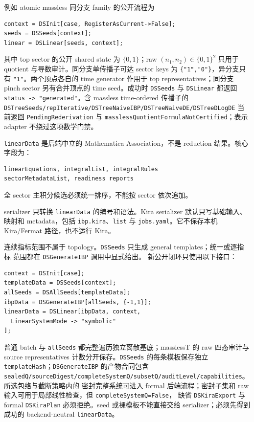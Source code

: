 ﻿\documentclass[a4paper,11pt]{article}
\begin{document}
例如 atomic massless 同分支 family 的公开流程为
\begin{verbatim}
context = DSInit[case, RegisterAsCurrent->False];
seeds = DSSeeds[context];
linear = DSLinear[seeds, context];
\end{verbatim}
其中 top sector 的公开 shared state 为 $\{0,1\}$；raw $(n_1,n_2)\in\{0,1\}^2$ 只用于 quotient 与导数审计。同分支单传播子可达 sector keys 为 \texttt{\{"1","0"\}}，异分支只有 \texttt{"1"}。两个顶点各自的 time generator 作用于 top representatives；同分支 pinch sector 另有合并顶点的 time seed。成功时 \texttt{DSSeeds} 与 \texttt{DSLinear} 都返回 \texttt{status -> "generated"}。含 massless time-ordered 传播子的 \texttt{DSTreeSeeds/repIterative/DSTreeNaiveIBP/DSTreeNaiveDE/DSTreeDLogDE} 当前返回 \texttt{PendingRederivation} 与 \texttt{masslessQuotientFormulaNotCertified}；表示 adapter 不绕过这项数学门禁。

\texttt{linearData} 是后端中立的 Mathematica Association，不是 reduction 结果。核心字段为：
\begin{verbatim}
linearEquations, integralList, integralRules
sectorMetadataList, readiness reports
\end{verbatim}
全 sector 主积分候选必须统一排序，不能按 sector 依次追加。

serializer 只转换 \texttt{linearData} 的编号和语法。Kira serializer 默认只写基础输入、映射和 metadata，包括 \texttt{ibp.kira}、\texttt{list} 与 \texttt{jobs.yaml}。它不保存本机 Kira/Fermat 路径，也不运行 Kira。

连续指标范围不属于 topology。\texttt{DSSeeds} 只生成 general templates；统一或逐指标
范围都在 \texttt{DSGenerateIBP} 调用中显式给出。
新公开闭环只使用以下接口：
\begin{verbatim}
context = DSInit[case];
templateData = DSSeeds[context];
allSeeds = DSAllSeeds[templateData];
ibpData = DSGenerateIBP[allSeeds, {-1,1}];
linearData = DSLinear[ibpData, context,
  LinearSystemMode -> "symbolic"
];
\end{verbatim}
普通 batch 与 \texttt{allSeeds} 都完整遍历独立离散基底；masslessT 的 raw 四态审计与 source representatives 计数分开保存。\texttt{DSSeeds} 的每条模板保存独立
\texttt{templateHash}；\texttt{DSGenerateIBP} 的产物合同包含
\texttt{sealedQ/sourceDigest/completeSystemQ/subsetQ/auditLevel/capabilities}。所选包络与截断策略内的
密封完整系统可进入 formal 后端流程；密封子集和 raw 输入可用于局部线性检查，但 \texttt{completeSystemQ=False}，
缺省 \texttt{DSKiraExport} 与 formal \texttt{DSKiraPlan} 必须拒绝。seed 或裸模板不能直接交给
serializer；必须先得到成功的 backend-neutral \texttt{linearData}。
\end{document}
